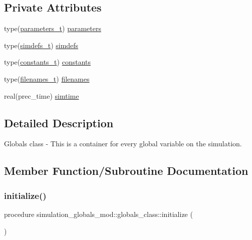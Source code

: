 \subsection*{Private Attributes}
\begin{DoxyCompactItemize}
\item 
type(\hyperlink{structsimulation__globals__mod_1_1parameters__t}{parameters\+\_\+t}) \hyperlink{structsimulation__globals__mod_1_1globals__class_aef60024afa0a128d0af3d8a47a732657}{parameters}
\item 
type(\hyperlink{structsimulation__globals__mod_1_1simdefs__t}{simdefs\+\_\+t}) \hyperlink{structsimulation__globals__mod_1_1globals__class_aa066434c9dc6147331dce613422568ae}{simdefs}
\item 
type(\hyperlink{structsimulation__globals__mod_1_1constants__t}{constants\+\_\+t}) \hyperlink{structsimulation__globals__mod_1_1globals__class_af178aeb39fefa2c7dec6a74faa04819c}{constants}
\item 
type(\hyperlink{structsimulation__globals__mod_1_1filenames__t}{filenames\+\_\+t}) \hyperlink{structsimulation__globals__mod_1_1globals__class_abb5045218897afcf2ccc51f63dc38761}{filenames}
\item 
real(prec\+\_\+time) \hyperlink{structsimulation__globals__mod_1_1globals__class_ab28ea8e0cca87c11a33e4acfb3d3b293}{simtime}
\end{DoxyCompactItemize}


\subsection{Detailed Description}
Globals class -\/ This is a container for every global variable on the simulation. 

\subsection{Member Function/\+Subroutine Documentation}
\mbox{\label{structsimulation__globals__mod_1_1globals__class_a9438f8bdec469e7cbf9b898a398f9745}} 
\subsubsection{\texorpdfstring{initialize()}{initialize()}}
{\footnotesize\ttfamily procedure simulation\+\_\+globals\+\_\+mod\+::globals\+\_\+class\+::initialize (\begin{DoxyParamCaption}{ }\end{DoxyParamCaption})\hspace{0.3cm}{\ttfamily [private]}}



